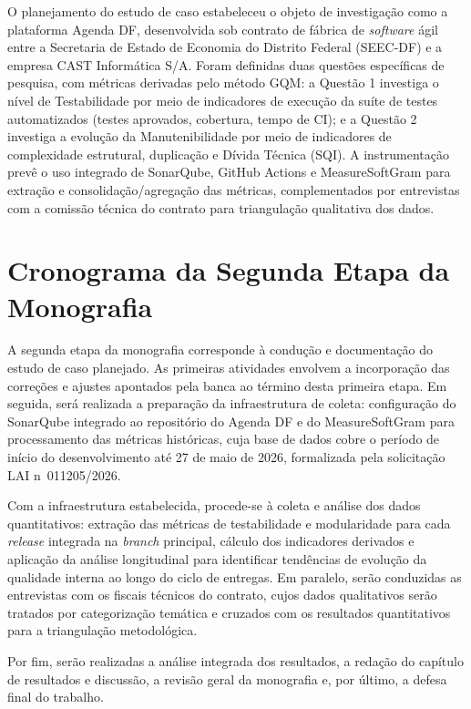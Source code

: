O planejamento do estudo de caso estabeleceu o objeto de investigação como a plataforma Agenda DF, desenvolvida sob contrato de fábrica de \textit{software} ágil entre a Secretaria de Estado de Economia do Distrito Federal (SEEC-DF) e a empresa CAST Informática S/A. Foram definidas duas questões específicas de pesquisa, com métricas derivadas pelo método GQM: a Questão 1 investiga o nível de Testabilidade por meio de indicadores de execução da suíte de testes automatizados (testes aprovados, cobertura, tempo de CI); e a Questão 2 investiga a evolução da Manutenibilidade por meio de indicadores de complexidade estrutural, duplicação e Dívida Técnica (SQI). A instrumentação prevê o uso integrado de SonarQube, GitHub Actions e MeasureSoftGram para extração e consolidação/agregação das métricas, complementados por entrevistas com a comissão técnica do contrato para triangulação qualitativa dos dados.

\section{Cronograma da Segunda Etapa da Monografia}

A segunda etapa da monografia corresponde à condução e documentação do estudo de caso planejado. As primeiras atividades envolvem a incorporação das correções e ajustes apontados pela banca ao término desta primeira etapa. Em seguida, será realizada a preparação da infraestrutura de coleta: configuração do SonarQube integrado ao repositório do Agenda DF e do MeasureSoftGram para processamento das métricas históricas, cuja base de dados cobre o período de início do desenvolvimento até 27 de maio de 2026, formalizada pela solicitação LAI n\textordmasculine~011205/2026.

Com a infraestrutura estabelecida, procede-se à coleta e análise dos dados quantitativos: extração das métricas de testabilidade e modularidade para cada \textit{release} integrada na \textit{branch} principal, cálculo dos indicadores derivados e aplicação da análise longitudinal para identificar tendências de evolução da qualidade interna ao longo do ciclo de entregas. Em paralelo, serão conduzidas as entrevistas com os fiscais técnicos do contrato, cujos dados qualitativos serão tratados por categorização temática e cruzados com os resultados quantitativos para a triangulação metodológica.

Por fim, serão realizadas a análise integrada dos resultados, a redação do capítulo de resultados e discussão, a revisão geral da monografia e, por último, a defesa final do trabalho.

